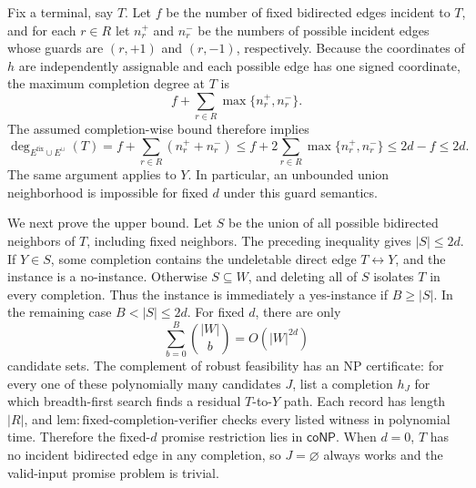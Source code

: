 Fix a terminal, say \(T\).  Let \(f\) be the number of fixed bidirected edges incident to \(T\), and for each \(r\in R\) let \(n_r^+\) and \(n_r^-\) be the numbers of possible incident edges whose guards are \((r,+1)\) and \((r,-1)\), respectively.  Because the coordinates of \(h\) are independently assignable and each possible edge has one signed coordinate, the maximum completion degree at \(T\) is
\[
 f+\sum_{r\in R}\max\{n_r^+,n_r^-\}.
\]
The assumed completion-wise bound therefore implies
\[
 \deg_{E^{\mathrm{fix}}\cup E^{\cup}}(T)
 =f+\sum_{r\in R}(n_r^++n_r^-)
 \le f+2\sum_{r\in R}\max\{n_r^+,n_r^-\}
 \le 2d-f\le2d.
\]
The same argument applies to \(Y\).  In particular, an unbounded union neighborhood is impossible for fixed \(d\) under this guard semantics.

We next prove the upper bound.  Let \(S\) be the union of all possible bidirected neighbors of \(T\), including fixed neighbors.  The preceding inequality gives \(|S|\le2d\).  If \(Y\in S\), some completion contains the undeletable direct edge \(T\leftrightarrow Y\), and the instance is a no-instance.  Otherwise \(S\subseteq W\), and deleting all of \(S\) isolates \(T\) in every completion.  Thus the instance is immediately a yes-instance if \(B\ge|S|\).  In the remaining case \(B<|S|\le2d\).  For fixed \(d\), there are only
\[
 \sum_{b=0}^{B}\binom{|W|}{b}=O(|W|^{2d})
\]
candidate sets.  The complement of robust feasibility has an NP certificate: for every one of these polynomially many candidates \(J\), list a completion \(h_J\) for which breadth-first search finds a residual \(T\)-to-\(Y\) path.  Each record has length \(|R|\), and \(\mathrm{lem{:}fixed\text{-}completion\text{-}verifier}\) checks every listed witness in polynomial time.  Therefore the fixed-\(d\) promise restriction lies in \(\mathsf{coNP}\).  When \(d=0\), \(T\) has no incident bidirected edge in any completion, so \(J=\varnothing\) always works and the valid-input promise problem is trivial.

